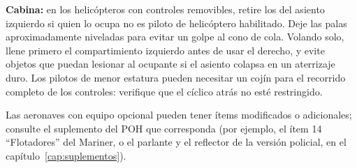 \begin{precaucion}
\textbf{Cabina:} en los helicópteros con controles removibles, retire los del asiento izquierdo si quien lo ocupa no es piloto de helicóptero habilitado. Deje las palas aproximadamente niveladas para evitar un golpe al cono de cola. Volando solo, llene primero el compartimiento izquierdo antes de usar el derecho, y evite objetos que puedan lesionar al ocupante si el asiento colapsa en un aterrizaje duro. Los pilotos de menor estatura pueden necesitar un cojín para el recorrido completo de los controles: verifique que el cíclico atrás no esté restringido.
\end{precaucion}

\begin{nota}
Las aeronaves con equipo opcional pueden tener ítems modificados o adicionales; consulte el suplemento del POH que corresponda (por ejemplo, el ítem 14 ``Flotadores'' del Mariner, o el parlante y el reflector de la versión policial, en el capítulo~\ref{cap:suplementos}).
\end{nota}
